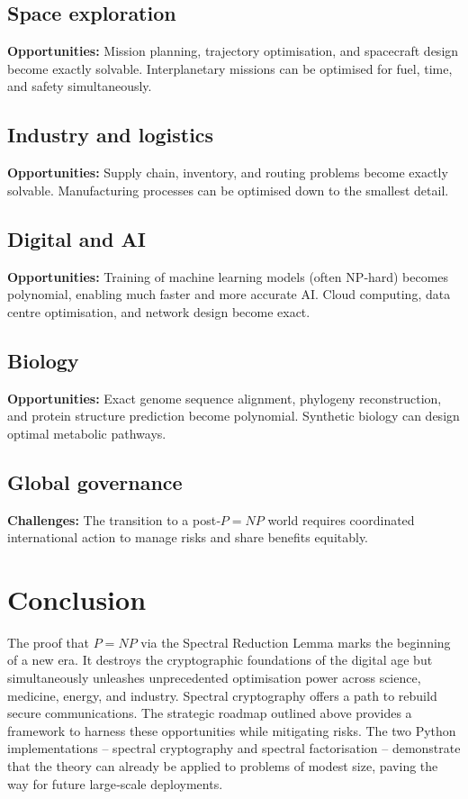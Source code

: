 \documentclass[11pt,a4paper]{article}
\begin{document}
\subsection{Space exploration}
\textbf{Opportunities:} Mission planning, trajectory optimisation, and spacecraft design become exactly solvable. Interplanetary missions can be optimised for fuel, time, and safety simultaneously.

\subsection{Industry and logistics}
\textbf{Opportunities:} Supply chain, inventory, and routing problems become exactly solvable. Manufacturing processes can be optimised down to the smallest detail.

\subsection{Digital and AI}
\textbf{Opportunities:} Training of machine learning models (often NP‑hard) becomes polynomial, enabling much faster and more accurate AI. Cloud computing, data centre optimisation, and network design become exact.

\subsection{Biology}
\textbf{Opportunities:} Exact genome sequence alignment, phylogeny reconstruction, and protein structure prediction become polynomial. Synthetic biology can design optimal metabolic pathways.

\subsection{Global governance}
\textbf{Challenges:} The transition to a post‑\(P = NP\) world requires coordinated international action to manage risks and share benefits equitably.

\section{Conclusion}

The proof that \(P = NP\) via the Spectral Reduction Lemma marks the beginning of a new era. It destroys the cryptographic foundations of the digital age but simultaneously unleashes unprecedented optimisation power across science, medicine, energy, and industry. Spectral cryptography offers a path to rebuild secure communications. The strategic roadmap outlined above provides a framework to harness these opportunities while mitigating risks. The two Python implementations – spectral cryptography and spectral factorisation – demonstrate that the theory can already be applied to problems of modest size, paving the way for future large‑scale deployments.
\end{document}
